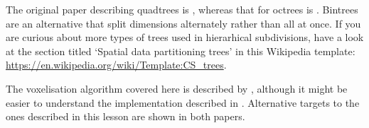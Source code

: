 The original paper describing quadtrees is \citet{Finkel74}, whereas that for octrees is \citet{Meagher80}.
Bintrees~\citep{Samet85} are an alternative that split dimensions alternately rather than all at once.
If you are curious about more types of trees used in hierarhical subdivisions, have a look at the section titled `Spatial data partitioning trees' in this Wikipedia template: \url{https://en.wikipedia.org/wiki/Template:CS_trees}.

The voxelisation algorithm covered here is described by \citet{Laine13}, although it might be easier to understand the implementation described in \citet{Nourian16}.
Alternative targets to the ones described in this lesson are shown in both papers.






